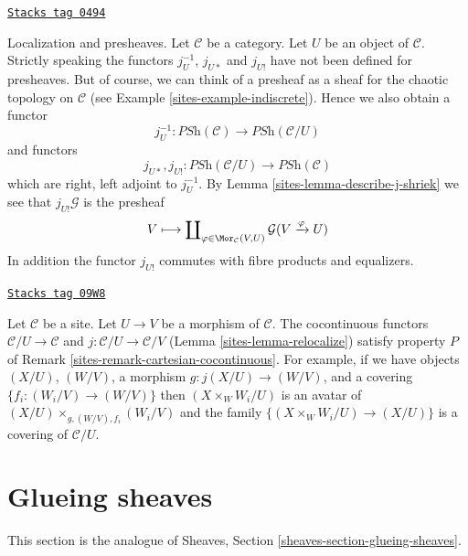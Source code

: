 \begin{remark}
\label{sites-remark-localize-presheaves}
\href{https://stacks.math.columbia.edu/tag/0494}{\texttt{Stacks tag 0494}}

Localization and presheaves. Let $\mathcal{C}$ be a category.
Let $U$ be an object of $\mathcal{C}$. Strictly speaking the functors
$j_U^{-1}$, $j_{U*}$ and $j_{U!}$ have not been defined for presheaves.
But of course, we can think of a presheaf as a sheaf for the
chaotic topology on $\mathcal{C}$ (see Example \ref{sites-example-indiscrete}).
Hence we also obtain a functor
$$
j_U^{-1} :
\textit{PSh}(\mathcal{C})
\longrightarrow
\textit{PSh}(\mathcal{C}/U)
$$
and functors
$$
j_{U*}, j_{U!} :
\textit{PSh}(\mathcal{C}/U)
\longrightarrow
\textit{PSh}(\mathcal{C})
$$
which are right, left adjoint to $j_U^{-1}$. By
Lemma \ref{sites-lemma-describe-j-shriek}
we see that $j_{U!}\mathcal{G}$ is the presheaf
$$
V \longmapsto
\coprod\nolimits_{\varphi \in \Mor_\mathcal{C}(V, U)}
\mathcal{G}(V \xrightarrow{\varphi} U)
$$
In addition the functor $j_{U!}$ commutes with fibre products and
equalizers.
\end{remark}

\begin{remark}
\label{sites-remark-localization-cartesian-cocontinuous}
\href{https://stacks.math.columbia.edu/tag/09W8}{\texttt{Stacks tag 09W8}}

Let $\mathcal{C}$ be a site. Let $U \to V$ be a morphism of $\mathcal{C}$.
The cocontinuous functors $\mathcal{C}/U \to \mathcal{C}$ and
$j : \mathcal{C}/U \to \mathcal{C}/V$ (Lemma \ref{sites-lemma-relocalize})
satisfy property $P$ of Remark \ref{sites-remark-cartesian-cocontinuous}.
For example, if we have objects $(X/U)$, $(W/V)$, a morphism
$g : j(X/U) \to (W/V)$, and a covering $\{f_i  : (W_i/V) \to (W/V)\}$ then
$(X \times_W W_i/U)$ is an avatar of $(X/U) \times_{g, (W/V), f_i} (W_i/V)$
and the family $\{(X \times_W W_i/U) \to (X/U)\}$ is a covering
of $\mathcal{C}/U$.
\end{remark}

\section{Glueing sheaves}
\label{sites-section-glueing-sheaves}
This section is the analogue of
Sheaves, Section \ref{sheaves-section-glueing-sheaves}.

